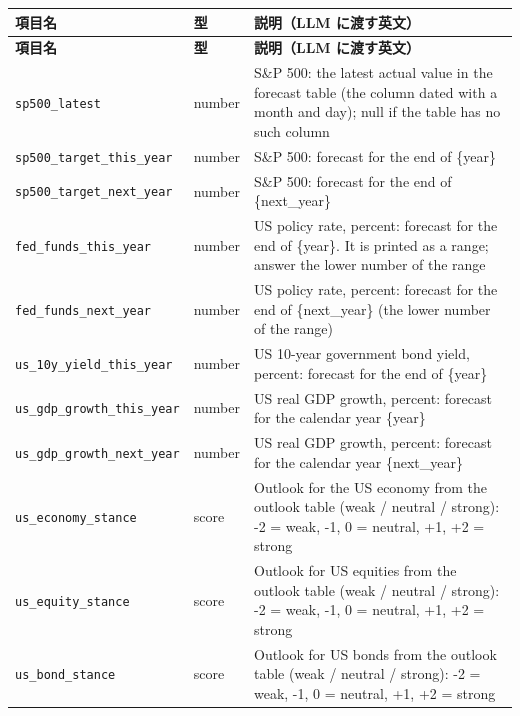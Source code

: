\documentclass[xelatex,ja=standard,jafont=hiragino-pron,a4paper,10pt]{bxjsreport}
\begin{document}
{\scriptsize
\begin{longtable}{p{4.40cm}p{1.20cm}p{8.60cm}}
\toprule
\textbf{項目名} & \textbf{型} & \textbf{説明（LLM に渡す英文）} \\
\midrule
\endfirsthead
\toprule
\textbf{項目名} & \textbf{型} & \textbf{説明（LLM に渡す英文）} \\
\midrule
\endhead
\bottomrule
\endfoot
\texttt{sp500\_\allowbreak{}latest} & number & S\&P 500: the latest actual value in the forecast table (the column dated with a month and day); null if the table has no such column \\
\texttt{sp500\_\allowbreak{}target\_\allowbreak{}this\_\allowbreak{}year} & number & S\&P 500: forecast for the end of \{year\} \\
\texttt{sp500\_\allowbreak{}target\_\allowbreak{}next\_\allowbreak{}year} & number & S\&P 500: forecast for the end of \{next\_year\} \\
\texttt{fed\_\allowbreak{}funds\_\allowbreak{}this\_\allowbreak{}year} & number & US policy rate, percent: forecast for the end of \{year\}. It is printed as a range; answer the lower number of the range \\
\texttt{fed\_\allowbreak{}funds\_\allowbreak{}next\_\allowbreak{}year} & number & US policy rate, percent: forecast for the end of \{next\_year\} (the lower number of the range) \\
\texttt{us\_\allowbreak{}10y\_\allowbreak{}yield\_\allowbreak{}this\_\allowbreak{}year} & number & US 10-year government bond yield, percent: forecast for the end of \{year\} \\
\texttt{us\_\allowbreak{}gdp\_\allowbreak{}growth\_\allowbreak{}this\_\allowbreak{}year} & number & US real GDP growth, percent: forecast for the calendar year \{year\} \\
\texttt{us\_\allowbreak{}gdp\_\allowbreak{}growth\_\allowbreak{}next\_\allowbreak{}year} & number & US real GDP growth, percent: forecast for the calendar year \{next\_year\} \\
\texttt{us\_\allowbreak{}economy\_\allowbreak{}stance} & score & Outlook for the US economy from the outlook table (weak / neutral / strong): -2 = weak, -1, 0 = neutral, +1, +2 = strong \\
\texttt{us\_\allowbreak{}equity\_\allowbreak{}stance} & score & Outlook for US equities from the outlook table (weak / neutral / strong): -2 = weak, -1, 0 = neutral, +1, +2 = strong \\
\texttt{us\_\allowbreak{}bond\_\allowbreak{}stance} & score & Outlook for US bonds from the outlook table (weak / neutral / strong): -2 = weak, -1, 0 = neutral, +1, +2 = strong \\

\end{longtable}}
\end{document}
